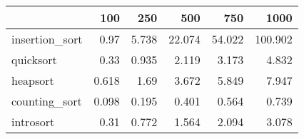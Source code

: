 \begin{tabular}{lrrrrr}
\hline
                &   100 &   250 &    500 &    750 &    1000 \\
\hline
 insertion\_sort & 0.97  & 5.738 & 22.074 & 54.022 & 100.902 \\
 quicksort      & 0.33  & 0.935 &  2.119 &  3.173 &   4.832 \\
 heapsort       & 0.618 & 1.69  &  3.672 &  5.849 &   7.947 \\
 counting\_sort  & 0.098 & 0.195 &  0.401 &  0.564 &   0.739 \\
 introsort      & 0.31  & 0.772 &  1.564 &  2.094 &   3.078 \\
\hline
\end{tabular}